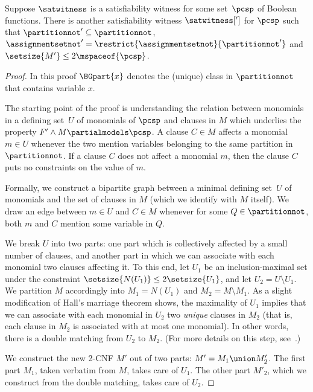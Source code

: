 \begin{lemma}
  \label{lem:locality}
  Suppose $\satwitness$ is a satisfiability witness for some %
  set~$\pcsp$ of Boolean functions.
  There is another satisfiability witness $\satwitness[']$ for $\pcsp$ such that $\partitionnot' \subseteq \partitionnot$, $\assignmentsetnot' = \restrict{\assignmentsetnot}{\partitionnot'}$ and $\setsize{M'} \leq 2\mspaceof{\pcsp}$.
\end{lemma}
\begin{proof}
In this proof $\BGpart{x}$ denotes the (unique) class in
$\partitionnot$ that contains variable $x$.

The starting point of the proof is understanding the relation between monomials in a %
defining set~$U$ of monomials
of $\pcsp$ and clauses in $M$ which underlies the property $F'\land M \partialmodels \pcsp$. A clause $C \in M$ affects a monomial $m \in U$ whenever the two mention variables belonging to the same partition in $\partitionnot$. If a clause $C$ does not affect a monomial $m$, then the clause $C$ puts no constraints on the value of $m$.

Formally, we construct a bipartite graph between a minimal %
defining set~$U$ of monomials
and the set of clauses in $M$ (which we identify with $M$ itself). We draw an edge between $m \in U$ and $C \in M$ whenever for some $Q \in \partitionnot$, both $m$ and $C$ mention some variable in $Q$.

We break $U$ into two parts: one part which is collectively affected by a small number of clauses, and another part in which we can associate with each monomial two clauses affecting it. To this end, let $U_1$ be an inclusion-maximal set under the constraint $\setsize{N(U_1)}\leq 2\setsize{U_1}$, and let $U_2=U\setminus U_1$. We partition $M$ accordingly into $M_1 = N(U_1)$ and $M_2 = M \setminus M_1$. As a slight modification of Hall's marriage theorem shows, the maximality of $U_1$ implies that we can associate with each monomial in $U_2$ two \emph{unique} clauses in $M_2$ (that is, each clause in $M_2$ is associated with at most one monomial). In other words, there is a double matching from $U_2$ to $M_2$. (For more details on this step, see~\cite{ABRW02SpaceComplexity,FLNRT15SpaceCplx,BG15Framework}.)

%

We construct the new 2-CNF $M'$ out of two parts: $M' = M_1 \union M'_2$. The first part $M_1$, taken verbatim from $M$, takes care of $U_1$. The other part $M'_2$, which we construct from the double matching, takes care of $U_2$.


\end{proof}
